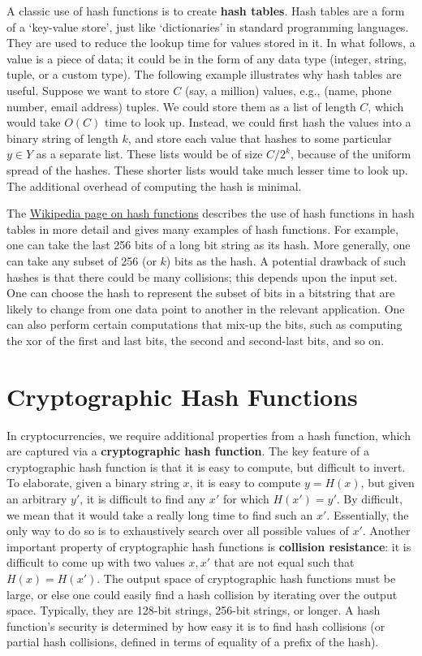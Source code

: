 \documentclass{article}
\begin{document}
A classic use of hash functions is to create \textbf{hash tables}. Hash tables are a form of a ‘key-value store’, just like ‘dictionaries’ in standard programming languages. They are used to reduce the lookup time for values stored in it. In what follows, a value is a piece of data; it could be in the form of any data type (integer, string, tuple, or a custom type). The following example illustrates why hash tables are useful. Suppose we want to store $C$ (say, a million) values, e.g., (name, phone number, email address) tuples. We could store them as a list of length $C$, which would take $O(C)$ time to look up. Instead, we could first hash the values into a binary string of length $k$, and store each value that hashes to some particular $y \in Y$ as a separate list. These lists would be of size $C/2^k$, because of the uniform spread of the hashes. These shorter lists would take much lesser time to look up. The additional overhead of computing the hash is minimal. 

The \href{https://en.wikipedia.org/wiki/Hash_function}{Wikipedia page on hash functions} describes the use of hash functions in hash tables in more detail and gives many examples of hash functions. For example, one can take the last 256 bits of a long bit string as its hash. More generally, one can take any subset of 256 (or $k$) bits as the hash. A potential drawback of such hashes is that there could be many collisions; this depends upon the input set. One can choose the hash to represent the subset of bits in a bitstring that are likely to change from one data point to another in the relevant application. One can also perform certain computations that mix-up the bits, such as computing the xor of the first and last bits, the second and second-last bits, and so on.

\section*{Cryptographic Hash Functions}
In cryptocurrencies, we require additional properties from a hash function, which are captured via a \textbf{cryptographic hash function}. The key feature of a cryptographic hash function is that it is easy to compute, but difficult to invert. To elaborate, given a binary string $x$, it is easy to compute $y = H(x)$, but given an arbitrary $y'$, it is difficult to find any $x'$ for which $H(x') = y'$. By difficult, we mean that it would take a really long time to find such an $x'$. Essentially, the only way to do so is to exhaustively search over all possible values of $x'$. Another important property of cryptographic hash functions is \textbf{collision resistance}: it is difficult to come up with two values $x, x'$ that are not equal such that $H(x) = H(x')$. The output space of cryptographic hash functions must be large, or else one could easily find a hash collision by iterating over the output space. Typically, they are 128-bit strings, 256-bit strings, or longer. A hash function’s security is determined by how easy it is to find hash collisions (or partial hash collisions, defined in terms of equality of a prefix of the hash).
\end{document}

